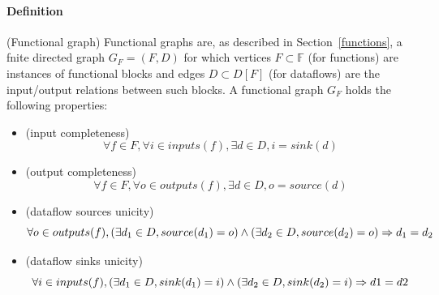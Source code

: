 \documentclass{article}
\begin{document}
\paragraph{Definition} (Functional graph) Functional graphs are, as described in Section~\ref{functions}, a fnite directed graph $G_F = (F,D)$ for which vertices $F\subset\mathbb{F}$ (for functions) are instances of functional blocks and edges $D \subset D[F]$ (for dataflows) are the input/output relations between such blocks.
A functional graph $G_F$ holds the following properties:
\begin{itemize}
    \item (input completeness)
    \begin{equation}
        \forall f\in F,\forall i \in inputs(f), \exists d \in D, i = sink(d)
    \end{equation}
    \item (output completeness)
    \begin{equation}
        \forall f\in F,\forall o \in outputs(f), \exists d \in D, o = source(d)
    \end{equation}
    \item (dataflow sources unicity)
    \begin{equation}
        \forall o \in outputs(f),\\(\exists d_1 \in D, source(d_1) = o)\wedge(\exists d_2 \in D, source(d_2) = o) \Rightarrow d_1 = d_2
    \end{equation}
    \item (dataflow sinks unicity)
    \begin{equation}
        \forall i \in inputs(f), \\(\exists d_1 \in D, sink(d_1) = i)\wedge(\exists d_2 \in D, sink(d_2) = i) \Rightarrow d1 = d2
    \end{equation}
\end{itemize}
\end{document}
